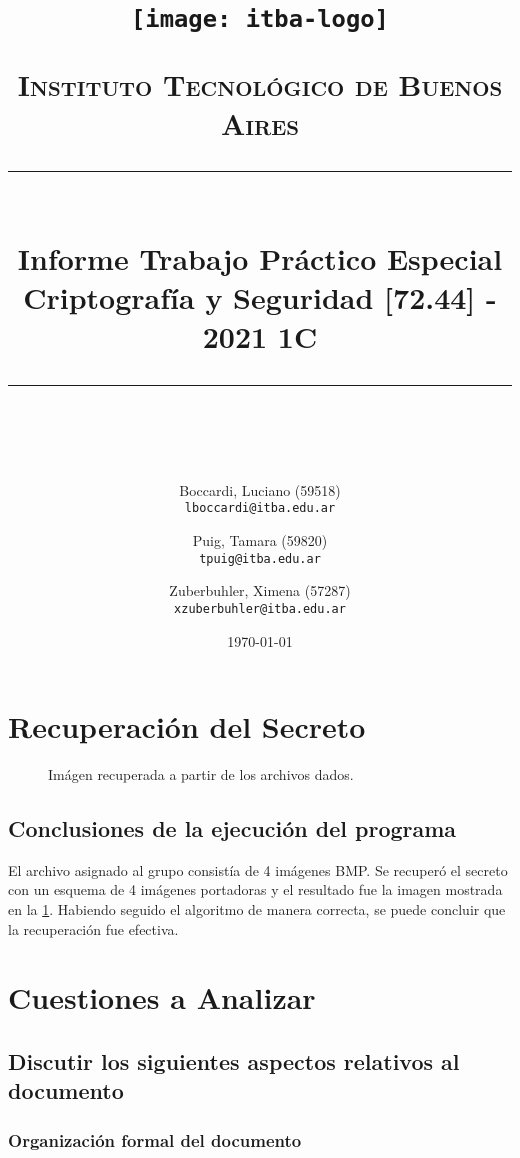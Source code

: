 \documentclass[11pt]{scrartcl} %
\title{	
	\begin{center}
		\texttt{[image: itba-logo]}
	\end{center}
	\vspace{25pt} %
	\normalfont\normalsize
	\textsc{Instituto Tecnológico de Buenos Aires}\\ %
	\vspace{25pt} %
	\rule{\linewidth}{0.5pt}\\ %
	\vspace{20pt} %
	{\huge Informe Trabajo Práctico Especial}\\ %
	\vspace{25pt} %
	{\huge Criptografía y Seguridad [72.44] - 2021 1C}\\ %
	\vspace{12pt} %
	\rule{\linewidth}{2pt}\\ %
	\vspace{12pt} %
}
\author{
  Boccardi, Luciano (59518)\\
  \texttt{lboccardi@itba.edu.ar}
  \and
  Puig, Tamara (59820)\\
  \texttt{tpuig@itba.edu.ar}
  \and
  Zuberbuhler, Ximena (57287)\\
  \texttt{xzuberbuhler@itba.edu.ar}
}
\date{\normalsize\today} %
\begin{document}
\maketitle %


\newpage

\section{Recuperación del Secreto}

\begin{figure}[h] %
	\centering
	\caption{Imágen recuperada a partir de los archivos dados.}
	\label{secret_image}
\end{figure}


\subsection{Conclusiones de la ejecución del programa}

El archivo asignado al grupo consistía de 4 imágenes BMP. Se recuperó el secreto con un esquema de 4 imágenes portadoras y el resultado fue la imagen mostrada en la \figurename{\ref{secret_image}}. Habiendo seguido el algoritmo de manera correcta, se puede concluir que la recuperación fue efectiva.


\section{Cuestiones a Analizar}

\subsection{Discutir los siguientes aspectos relativos al documento}

\subsubsection{Organización formal del documento}
\end{document}
